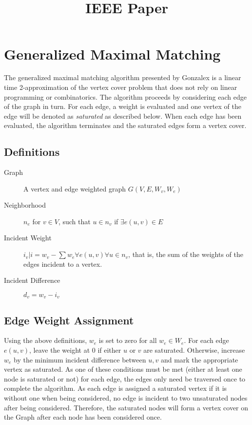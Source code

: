 \documentclass[conference, 11pt]{IEEEtran}
\theoremstyle{definition}
\begin{document}
\title{IEEE Paper} 

\author{
}

\maketitle

\begin{abstract}

\end{abstract}
\section{Generalized Maximal Matching}
The generalized maximal matching algorithm presented by Gonzalex is a linear time 2-approximation of the vertex cover problem that does not rely on linear programming or combinatorics.\cite{Gonzalez1995129} The algorithm proceeds by considering each edge of the graph in turn. For each edge, a weight is evaluated and one vertex of the edge will be denoted as {\em saturated} as described below. When each edge has been evaluated, the algorithm terminates and the saturated edges form a vertex cover.

\subsection{Definitions}
\begin{description}
\item [Graph] A vertex and edge weighted graph $G(V,E,W_v, W_e)$
\item [Neighborhood] $n_e$ for $v\in V$, such that $u \in n_v$ if $\exists e(u,v) \in E$
\item [Incident Weight] $i_v | i = w_v - \sum w_e \forall e(u,v) \forall u \in n_v$, that is, the sum of the weights of the edges incident to a vertex.
\item [Incident Difference] $d_v = w_v - i_v$
\end{description}

\subsection{Edge Weight Assignment}
\label{sec:sequential}
Using the above definitions, $w_e$ is set to zero for all $w_e\in W_e$. For each edge $e(u,v)$, leave the weight at 0 if either $u$ or $v$ are saturated. Otherwise, increase $w_e$ by the minimum incident difference between $u,v$ and mark the appropriate vertex as saturated. As one of these conditions must be met (either at least one node is saturated or not) for each edge, the edges only need be traversed once to complete the algorithm. As each edge is assigned a saturated vertex if it is without one when being considered, no edge is incident to two unsaturated nodes after being considered. Therefore, the saturated nodes will form a vertex cover on the Graph after each node has been considered once.
\end{document}
